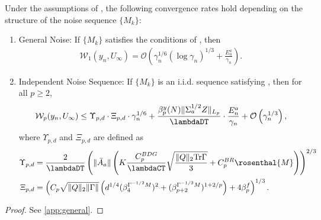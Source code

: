 \documentclass[11pt]{article}
\begin{document}
\begin{theorem}\label{thm:general}
    Under the assumptions of , the following convergence rates hold depending on the structure of the noise sequence $\{M_k\}$:

    \begin{enumerate}
        \item General Noise: If $\{M_k\}$ satisfies the conditions of , then
        \begin{equation}\label{eq:W1_main}
        \begin{split}
            \mathcal{W}_1 (y_n, U_\infty) 
            =
            \mathcal{O}\left(\gamma_n^{1/6} \left(\log \gamma_n \right)^{1/3}
            + \frac{E_n^a}{\gamma_n} \right) 
            .
        \end{split}
        \end{equation}

        \item Independent Noise Sequence: If $\{M_k\}$ is an i.i.d. sequence satisfying , then for all $p \geq 2$,
        \begin{equation}\label{eq:Wp_main}
        \mathcal{W}_p (y_n, U_\infty)  
        \leq
        \Upsilon_{p,d} \cdot \Xi_{p, d}\cdot \gamma_n^{1/6}
        +
        \frac{\beta_p^y (N) \lVert \Sigma_a^{1/2}Z\rVert_{L_p}}{\lambdaDT}\cdot \frac{E_{n}^a}{\gamma_n}
        + 
        \mathcal{O}\left( \gamma_n^{1/3} \right), 
        \end{equation}        
        where $\Upsilon_{p,d}$ and $\Xi_{p,d}$ are defined as
        \begin{equation*}
        \begin{split}
    \Upsilon_{p,d} &= 
     \frac{2}{\lambdaDT} \left(\lVert \bar{A}_a \rVert \left(K \frac{C_p^{BDG}}{ \lambdaCT} \sqrt{\frac{\lVert Q \rVert_2\mathrm{Tr} \Gamma}{3}}  + C_p^{BR} \rosenthal{M} \right) \right)^{2/3}   
\\
        \Xi_{p,d} &=
        \left(  C_p \sqrt{\lVert Q \rVert_2 \lVert \Gamma \rVert}
        \left(d^{1/4} (\beta_4^{\Gamma^{-1/2}M})^2 + (\beta_{p+2}^{\Gamma^{-1/2}M})^{1+2/p} \right)  
        + 4 \beta_p^f\right)^{1/3}         
        .
        \end{split}       
        \end{equation*}

    \end{enumerate}    
\end{theorem}
\begin{proof}
    See \cref{app:general}.
\end{proof}
\end{document}
